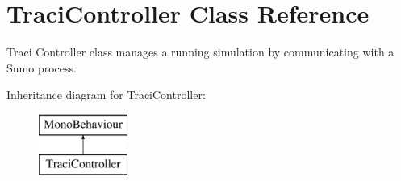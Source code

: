 \hypertarget{class_traci_controller}{}\section{Traci\+Controller Class Reference}
\label{class_traci_controller}


Traci Controller class manages a running simulation by communicating with a Sumo process.  


Inheritance diagram for Traci\+Controller\+:\begin{figure}[H]
\begin{center}
\leavevmode
\includegraphics[height=2.000000cm]{class_traci_controller}
\end{center}
\end{figure}
